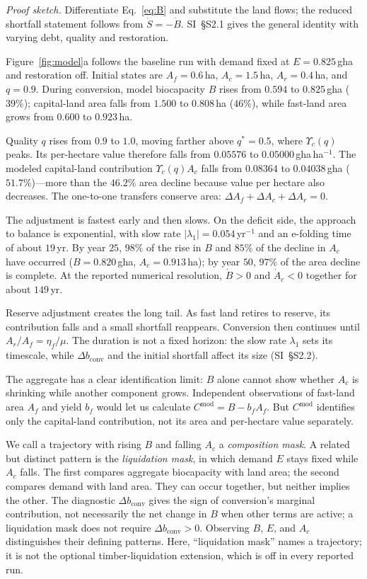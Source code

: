\documentclass[preprint,12pt,authoryear]{elsarticle}
\newcommand{\dconv}{\Delta b_{\mathrm{conv}}}
\newcommand{\Ups}{\Upsilon_c}
\begin{document}
\noindent\emph{Proof sketch.} Differentiate Eq.~\eqref{eq:B} and substitute the land flows; the reduced shortfall statement follows from $\dot S=-\dot B$. SI~\S S2.1 gives the general identity with varying debt, quality and restoration.

Figure~\ref{fig:model}a follows the baseline run with demand fixed at $E=0.825$\,gha and restoration off. Initial states are $A_f=0.6$\,ha, $A_c=1.5$\,ha, $A_r=0.4$\,ha, and $q=0.9$. During conversion, model biocapacity $B$ rises from $0.594$ to $0.825$\,gha ($39\%$); capital-land area falls from $1.500$ to $0.808$\,ha ($46\%$), while fast-land area grows from $0.600$ to $0.923$\,ha.

Quality $q$ rises from $0.9$ to $1.0$, moving farther above $q^*=0.5$, where $\Ups(q)$ peaks. Its per-hectare value therefore falls from $0.05576$ to $0.05000$\,gha\,ha$^{-1}$. The modeled capital-land contribution $\Ups(q)A_c$ falls from $0.08364$ to $0.04038$\,gha ($51.7\%$)—more than the $46.2\%$ area decline because value per hectare also decreases. The one-to-one transfers conserve area: $\Delta A_f+\Delta A_c+\Delta A_r=0$.

The adjustment is fastest early and then slows. On the deficit side, the approach to balance is exponential, with slow rate $|\lambda_1|=0.054$\,yr$^{-1}$ and an e-folding time of about $19$\,yr. By year $25$, $98\%$ of the rise in $B$ and $85\%$ of the decline in $A_c$ have occurred ($B=0.820$\,gha, $A_c=0.913$\,ha); by year $50$, $97\%$ of the area decline is complete. At the reported numerical resolution, $\dot B>0$ and $\dot A_c<0$ together for about $149$\,yr.

Reserve adjustment creates the long tail. As fast land retires to reserve, its contribution falls and a small shortfall reappears. Conversion then continues until $A_r/A_f=\eta_f/\mu$. The duration is not a fixed horizon: the slow rate $\lambda_1$ sets its timescale, while $\dconv$ and the initial shortfall affect its size (SI~\S S2.2).

The aggregate has a clear identification limit: $B$ alone cannot show whether $A_c$ is shrinking while another component grows. Independent observations of fast-land area $A_f$ and yield $b_f$ would let us calculate $C^{\mathrm{mod}}=B-b_fA_f$. But $C^{\mathrm{mod}}$ identifies only the capital-land contribution, not its area and \mbox{per-hectare} value separately.

We call a trajectory with rising $B$ and falling $A_c$ a \emph{composition mask}. A related but distinct pattern is the \emph{liquidation mask}, in which demand $E$ stays fixed while $A_c$ falls. The first compares aggregate biocapacity with land area; the second compares demand with land area. They can occur together, but neither implies the other. The diagnostic $\dconv$ gives the sign of conversion's marginal contribution, not necessarily the net change in $B$ when other terms are active; a liquidation mask does not require $\dconv>0$. Observing $B$, $E$, and $A_c$ distinguishes their defining patterns. Here, “liquidation mask” names a trajectory; it is not the optional timber-liquidation extension, which is off in every reported run.
\end{document}
